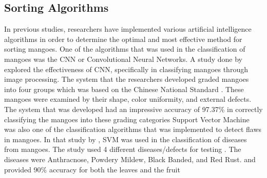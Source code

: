 \subsection{Sorting Algorithms}
In previous studies, researchers have implemented various artificial intelligence
algorithms in order to determine the optimal and most effective method for sorting
mangoes. One of the algorithms that was used in the classification of mangoes was the
CNN or Convolutional Neural Networks. A study done by \citet{zheng-mango-2021}
explored the effectiveness of CNN, specifically in classifying mangoes through image
processing. The system that the researchers developed graded mangoes into four groups
which was based on the Chinese National Standard \citep{zheng-mango-2021}. These mangoes were examined by
their shape, color uniformity, and external defects. The system that was developed had
an impressive accuracy of 97.37\% in correctly classifying the mangoes into these
grading categories
Support Vector Machine was also one of the classification algorithms that was
implemented to detect flaws in mangoes. In that study by \citet{veling-mango-2019}, SVM
was used in the classification of diseases from mangoes. The study used 4 different
diseases/defects for testing \citep{veling-mango-2019}. The diseases were Anthracnose, Powdery Mildew, Black
Banded, and Red Rust. and provided 90\% accuracy for both the leaves and the fruit

